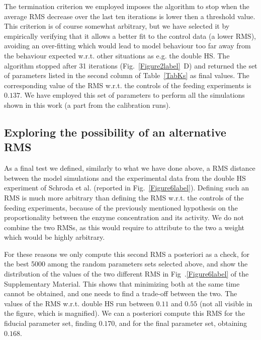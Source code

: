 \documentclass[oneside, 10pt, a4paper, twocolumn]{article}
\begin{document}
The termination criterion we employed imposes the algorithm to stop when the average RMS decrease over the last ten iterations is lower then a threshold value. This criterion is of course somewhat arbitrary, but we have selected it by empirically verifying that it allows a better fit to the control data (a lower RMS), avoiding an over-fitting which would lead to model behaviour too far away from the behaviour expected w.r.t. other situations as e.g. the double HS. %
The algorithm stopped after 31 iterations (Fig.~\ref{Figure2label}~D) and returned the set of parameters listed in the second column of Table~\ref{TabKs} as final values. The corresponding value of the RMS w.r.t. the controls of the feeding experiments is $0.137$.  We have employed this set of parameters to perform all the simulations shown in this work (a part from the calibration runs).




\subsection{Exploring the possibility of an alternative RMS}

As a final test we defined, similarly to what we have done above, a RMS distance between the model simulations and the experimental data from the double HS experiment of Schroda et al. \cite{Schroda2000} (reported in Fig.~\ref{Figure6label}). 
Defining such an RMS is much more arbitrary than defining the RMS w.r.t. the controls of the feeding experiments, because of the previously mentioned hypothesis on the proportionality between the enzyme concentration and its activity. %
We do not combine the two RMSs, as this would require to attribute to the two a weight which would be highly arbitrary. 

For these reasons we only compute this second RMS a posteriori as a check, for the best 5000 among the random parameters sets selected above, and show the distribution of the values of the two different RMS in Fig~.\ref{Figure6label} of the Supplementary Material. This shows that minimizing both at the same time cannot be obtained, and one needs to find a trade-off between the two. The values of the RMS w.r.t. double HS run between $0.11$ and $0.55$ (not all visible in the figure, which is magnified). We can a posteriori compute this RMS for the fiducial parameter set, finding $0.170$, and for the final parameter set, obtaining $0.168$.
\end{document}
